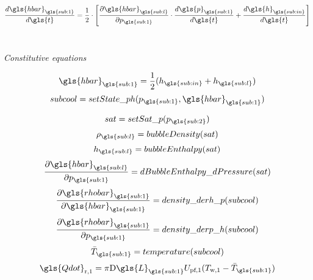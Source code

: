 \documentclass[11pt]{article} %
\begin{document}
\begin{equation}
\frac{d \gls{hbar}_{\gls{sub:1}}}{d \gls{t}} = \frac{1}{2} \cdot \left[\frac{\partial \gls{hbar}_{\gls{sub:l}}}{\partial p_{\gls{sub:1}}} \cdot \frac{d \gls{p}_{\gls{sub:1}}}{d \gls{t}} + \frac{d \gls{h}_{\gls{sub:in}}}{d \gls{t}}\right]
\end{equation}
\\
\begin{center}
\textit{Constitutive equations}\\
\end{center}

\begin{equation}
\gls{hbar}_{\gls{sub:1}} =  \frac{1}{2}(h_{\gls{sub:in}} + {h}_{\gls{sub:l}})
\end{equation}
\begin{equation}
subcool = setState\_ph(p_{\gls{sub:1}},\gls{hbar}_{\gls{sub:1}})
\end{equation}

\begin{equation}
sat = setSat\_p(p_{\gls{sub:2}})
\end{equation}
\begin{equation}
\rho_{\gls{sub:l}} = bubbleDensity(sat)
\end{equation}
\begin{equation}
h_{\gls{sub:l}} = bubbleEnthalpy(sat)
\end{equation}
\begin{equation}
\frac{\partial \gls{hbar}_{\gls{sub:l}}}{\partial p_{\gls{sub:1}}}= dBubbleEnthalpy\_dPressure(sat)
\end{equation}
\begin{equation}
\frac{\partial \gls{rhobar}_{\gls{sub:1}}}{\partial \gls{hbar}_{\gls{sub:1}}}= density\_derh\_p(subcool)
\end{equation}
\begin{equation}
\frac{\partial \gls{rhobar}_{\gls{sub:1}}}{\partial p_{\gls{sub:1}}}= density\_derp\_h(subcool)
\end{equation}
\begin{equation}
\bar{T}_{\gls{sub:1}} = temperature(subcool)
\end{equation}
\begin{equation}
\gls{Qdot}_\text{r,1} = \pi \text{D} \gls{L}_{\gls{sub:1}} U_\text{pf,1} (T_\text{w,1} - \bar{T}_{\gls{sub:1}})
\end{equation}

\end{document}
